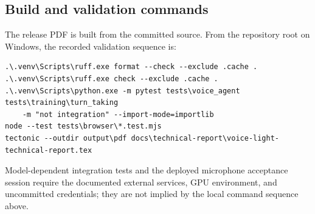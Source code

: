 \documentclass[10pt,twocolumn]{article}
\begin{document}
\subsection{Build and validation commands}

The release PDF is built from the committed source. From the repository root on Windows, the
recorded validation sequence is:

\begin{small}
\begin{verbatim}
.\.venv\Scripts\ruff.exe format --check --exclude .cache .
.\.venv\Scripts\ruff.exe check --exclude .cache .
.\.venv\Scripts\python.exe -m pytest tests\voice_agent tests\training\turn_taking
    -m "not integration" --import-mode=importlib
node --test tests\browser\*.test.mjs
tectonic --outdir output\pdf docs\technical-report\voice-light-technical-report.tex
\end{verbatim}
\end{small}

Model-dependent integration tests and the deployed microphone acceptance session require the
documented external services, GPU environment, and uncommitted credentials; they are not implied by
the local command sequence above.
\end{document}
